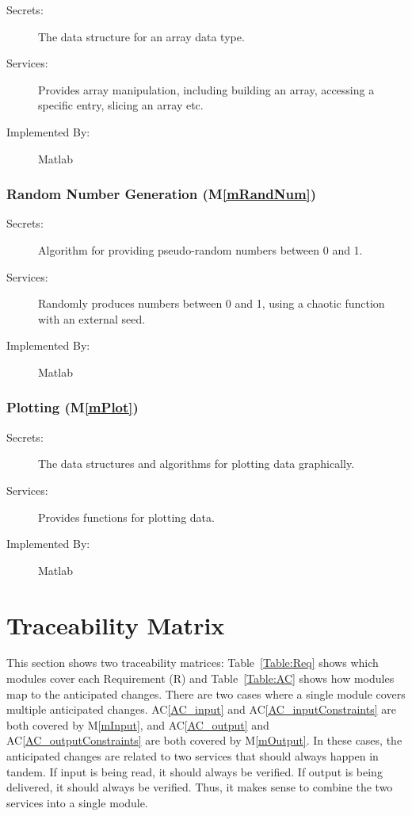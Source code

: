 \documentclass[12pt, titlepage]{article}
\newcommand{\acref}[1]{AC\ref{#1}}
\newcommand{\mref}[1]{M\ref{#1}}
\begin{document}
\begin{description}
\item[Secrets:] The data structure for an array data type.
\item[Services:] Provides array manipulation, including building an
  array, accessing a specific entry, slicing an array etc.
\item[Implemented By:] Matlab
\end{description}


\subsubsection{Random Number Generation (\mref{mRandNum})}

\begin{description}
\item[Secrets:] Algorithm for providing pseudo-random numbers between 0 and 1.
\item[Services:] Randomly produces numbers between 0 and 1, using a
  chaotic function with an external seed.
\item[Implemented By:] Matlab
\end{description}


\subsubsection{Plotting (\mref{mPlot})}

\begin{description}
\item[Secrets:] The data structures and algorithms for plotting data
  graphically.
\item[Services:] Provides functions for plotting data.
\item[Implemented By:] Matlab
\end{description}

\section{Traceability Matrix} \label{SecTM}

\hspace{3ex}This section shows two traceability matrices: Table~\ref{Table:Req} 
shows which modules cover each Requirement (R) and Table~\ref{Table:AC} shows 
how modules map to the anticipated changes. There are two cases where a single 
module covers multiple anticipated changes. \acref{AC_input} and 
\acref{AC_inputConstraints} are both covered by \mref{mInput}, and 
\acref{AC_output} and \acref{AC_outputConstraints} are both covered by 
\mref{mOutput}. In these cases, the anticipated changes are related to two 
services that should always happen in tandem. If input is being read, it should 
always be verified. If output is being delivered, it should always be verified. 
Thus, it makes sense to combine the two services into a single module.
\end{document}
